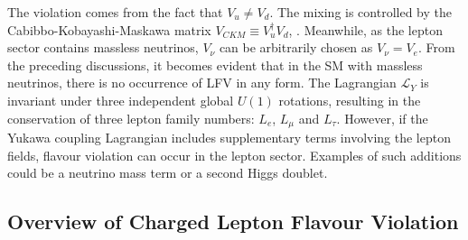 The violation comes from the fact that $V_u \neq V_d$. The mixing 
is controlled by the Cabibbo-Kobayashi-Maskawa matrix 
$V_{CKM}\equiv V^{\dagger}_u V_d $, \cite{PhysRevLett.10.531}. 
Meanwhile, as the lepton sector contains massless neutrinos, 
$V_{\nu}$ can be arbitrarily chosen as $V_{\nu}=V_e$. From the 
preceding discussions, it becomes evident that in the SM with 
massless neutrinos, there is no occurrence of LFV in any form. The 
Lagrangian $\mathscr{L}_Y$ is invariant under three independent 
global $U(1)$ rotations, resulting in the conservation of three 
lepton family numbers: $L_e$, $L_\mu$ and $L_\tau$. However, if the 
Yukawa coupling Lagrangian includes supplementary terms involving the 
lepton fields, flavour violation can occur in the lepton sector. 
Examples of such additions could be a neutrino mass term or a second Higgs doublet.

\subsection{Overview of Charged Lepton Flavour Violation}\label{ovclfv}


